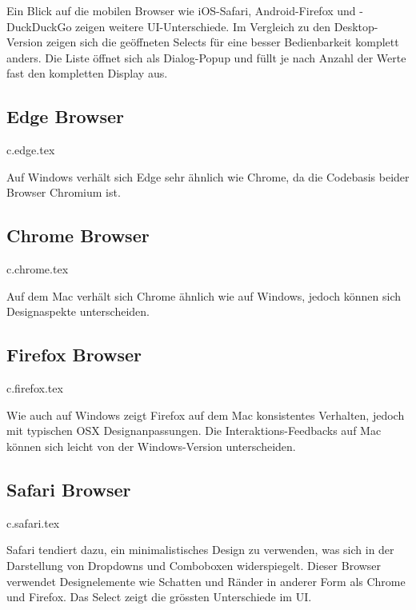Ein Blick auf die mobilen Browser wie iOS-Safari, Android-Firefox und -DuckDuckGo zeigen weitere UI-Unterschiede.
Im Vergleich zu den Desktop-Version zeigen sich die geöffneten Selects für eine besser Bedienbarkeit komplett anders.
Die Liste öffnet sich als Dialog-Popup und füllt je nach Anzahl der Werte fast den kompletten Display aus.



\clearpage
\subsection{Edge Browser}
\label{sec:edgeBrowser}

{c.edge.tex}

Auf Windows verhält sich Edge sehr ähnlich wie Chrome, da die Codebasis beider Browser Chromium ist.


\clearpage
\subsection{Chrome Browser}
\label{sec:chromeBrowser}

{c.chrome.tex}

Auf dem Mac verhält sich Chrome ähnlich wie auf Windows, jedoch können sich Designaspekte unterscheiden. 


\clearpage
\subsection{Firefox Browser}
\label{sec:firefoxBrowser}

{c.firefox.tex}

Wie auch auf Windows zeigt Firefox auf dem Mac konsistentes Verhalten, jedoch mit typischen OSX Designanpassungen. 
Die Interaktions-Feedbacks auf Mac können sich leicht von der Windows-Version unterscheiden.


\clearpage
\subsection{Safari Browser}
\label{sec:safariBrowser}

{c.safari.tex}

Safari tendiert dazu, ein minimalistisches Design zu verwenden, was sich in der Darstellung von Dropdowns und Comboboxen widerspiegelt.
Dieser Browser verwendet Designelemente wie Schatten und Ränder in anderer Form als Chrome und Firefox.
Das Select zeigt die grössten Unterschiede im UI.


